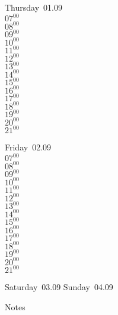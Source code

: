 \documentclass[11pt,a4paper]{book}\usepackage[]{graphicx}\usepackage[]{color}
\begin{document}
\clearpage
\begin{headerbox}
\end{headerbox}
\begin{weekdaybox}
  Thursday~01.09\\
  { 
  \vfill
  $07^{00}$\\
$08^{00}$\\
$09^{00}$\\
$10^{00}$\\
$11^{00}$\\
$12^{00}$\\
$13^{00}$\\
$14^{00}$\\
$15^{00}$\\
$16^{00}$\\
$17^{00}$\\
$18^{00}$\\
$19^{00}$\\
$20^{00}$\\
$21^{00}$\\
  }
\end{weekdaybox} 
\begin{weekdaybox}
  Friday~02.09\\
  { 
  \vfill
  $07^{00}$\\
$08^{00}$\\
$09^{00}$\\
$10^{00}$\\
$11^{00}$\\
$12^{00}$\\
$13^{00}$\\
$14^{00}$\\
$15^{00}$\\
$16^{00}$\\
$17^{00}$\\
$18^{00}$\\
$19^{00}$\\
$20^{00}$\\
$21^{00}$\\
  }
\end{weekdaybox}
\begin{weekendbox}
  Saturday~03.09
  \tcblower
  Sunday~04.09
\end{weekendbox} %
\begin{notebox}
  Notes
\end{notebox}
\clearpage
\end{document}
